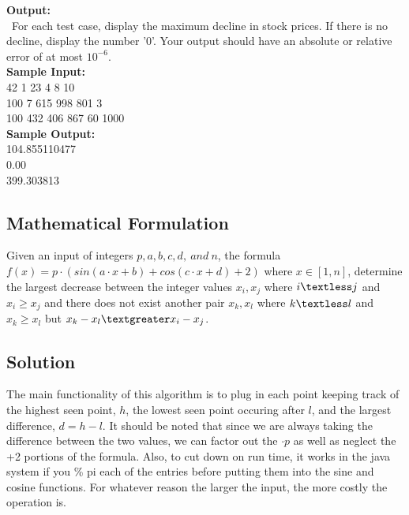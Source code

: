 \documentclass[12pt]{article}
\begin{document}
\noindent \textbf{Output:} \\
~\indent For each test case, display the maximum decline in stock prices. If there is no decline, display the
number '0'. Your output should have an absolute or relative error of at most $10^{-6}$. \\

\noindent \textbf{Sample Input:} \\
42 1 23 4 8 10  \\
100 7 615 998 801 3  \\
100 432 406 867 60 1000  \\

\noindent \textbf{Sample Output:} \\
104.855110477  \\
0.00           \\
399.303813


\newpage

\subsection{Mathematical Formulation}
Given an input of integers $p, a, b, c, d,\ and\ n$, the formula
$f(x) = p\cdot (sin(a\cdot x + b) + cos(c\cdot x + d) + 2)$ where $x \in [1, n]$, determine the largest
decrease between the integer values $x_i, x_j$ where $i \textless j$ and $x_i \geq x_j$ and there does
not exist another pair $x_k, x_l$ where $k \textless l$ and $x_k \geq x_l$ but $x_k - x_l \textgreater x_i - x_j$.


\subsection{Solution}
The main functionality of this algorithm is to plug in each point keeping track of the highest seen point, $h$,
the lowest seen point occuring after $l$, and the largest difference, $d = h-l$. It should be noted that since
we are always taking the difference between the two values, we can factor out the $\cdot p$ as well as neglect
the +2 portions of the formula. Also, to cut down on run time, it works in the java system if you \% pi each of
the entries before putting them into the sine and cosine functions. For whatever reason the larger the input,
the more costly the operation is.
\end{document}
